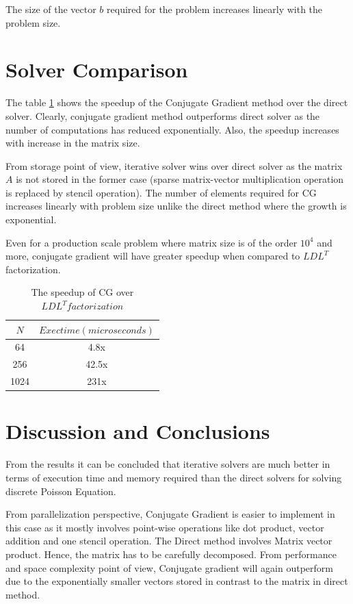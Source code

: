 \documentclass{article}
\begin{document}
\begin{spacing}{1.1}
The size of the vector $b$ required for the problem increases linearly with the problem size.

\section{Solver Comparison}

The table \ref{speedup} shows the speedup of the Conjugate Gradient method over the direct solver. Clearly, conjugate gradient method outperforms direct solver as the number of computations has reduced exponentially. Also, the speedup increases with increase in the matrix size.

From storage point of view, iterative solver wins over direct solver as the matrix $A$ is not stored in the former case (sparse matrix-vector multiplication operation is replaced by stencil operation). The number of elements required for CG increases linearly with problem size unlike the direct method where the growth is exponential.

Even for a production scale problem where matrix size is of the order $10^4$ and more, conjugate gradient will have greater speedup when compared to $LDL^T$ factorization.

\begin{table}[H]
\begin{center}
 \begin{tabular}{| c | c |} 
 \hline
$N$ & $Exec time (microseconds)$  \\ %
 \hline
64 & 4.8x \\ %
256 & 42.5x \\ %
1024 &  231x \\ %
 \hline
\end{tabular}%
\end{center}
\caption{\label{speedup} The speedup of CG over $LDL^T factorization$  } 
\end{table}

\section{Discussion and Conclusions}

From the results it can be concluded that iterative solvers are much better in terms of execution time and memory required than the direct solvers for solving discrete Poisson Equation.

From parallelization perspective, Conjugate Gradient is easier to implement in this case as it mostly involves point-wise operations like dot product, vector addition and one stencil operation. The Direct method involves Matrix vector product. Hence, the matrix has to be carefully decomposed. From performance and space complexity point of view, Conjugate gradient will again outperform due to the exponentially smaller vectors stored in contrast to the matrix in direct method.


\end{spacing}
\end{document}
